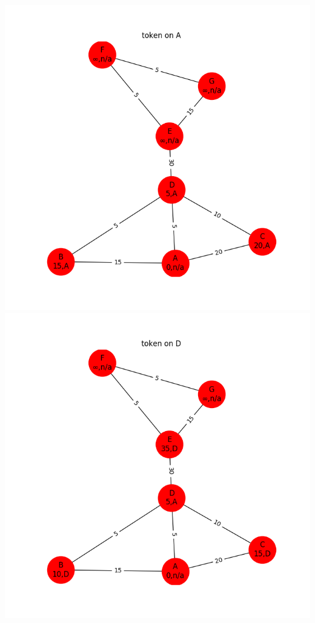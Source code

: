 \documentclass{article}
\begin{document}
\begin{enumerate}
\begin{enumerate}
    \includegraphics[width=\textwidth,height=\textheight,keepaspectratio]{4a1}
    \includegraphics[width=\textwidth,height=\textheight,keepaspectratio]{4a2}

\end{enumerate}
\end{enumerate}
\end{document}
